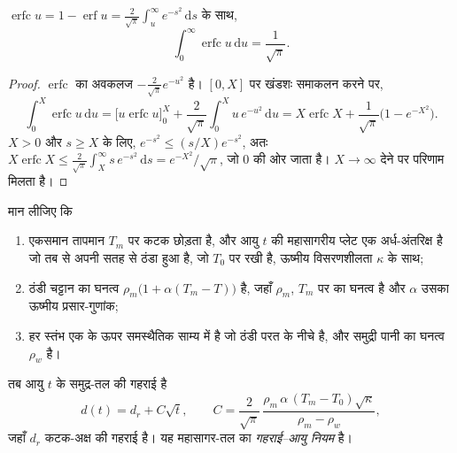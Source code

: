 \begin{lemma}[त्रुटि-फलन का एक समाकल]\label{lem:b1:rifts-ridges-margins:erfc}
$\operatorname{erfc} u = 1 - \operatorname{erf} u =
\frac{2}{\sqrt\pi}\int_u^\infty e^{-s^2}\,\mathrm ds$ के साथ,
\[
  \int_0^\infty \operatorname{erfc} u \,\mathrm du = \frac{1}{\sqrt\pi}.
\]
\end{lemma}

\begin{proof}
$\operatorname{erfc}$ का अवकलज $-\frac{2}{\sqrt\pi}e^{-u^2}$ है। $[0, X]$ पर खंडशः समाकलन करने पर,
\[
  \int_0^X \operatorname{erfc} u\,\mathrm du
  = \bigl[u \operatorname{erfc} u\bigr]_0^X + \frac{2}{\sqrt\pi}\int_0^X u\,e^{-u^2}\,\mathrm du
  = X\operatorname{erfc} X + \frac{1}{\sqrt\pi}\bigl(1 - e^{-X^2}\bigr).
\]
$X > 0$ और $s \ge X$ के लिए, $e^{-s^2} \le (s/X)e^{-s^2}$, अतः
$X\operatorname{erfc} X \le \frac{2}{\sqrt\pi}\int_X^\infty s\,e^{-s^2}\,\mathrm ds
= e^{-X^2}/\sqrt\pi$, जो 0 की ओर जाता है। $X \to \infty$ देने पर परिणाम मिलता है।
\end{proof}

\begin{theorem}[गहराई–आयु नियम]\label{thm:b1:rifts-ridges-margins:depth-age}
मान लीजिए कि
\begin{enumerate}
  \item {} एकसमान तापमान $T_m$ पर कटक छोड़ता है, और आयु $t$ की महासागरीय प्लेट एक अर्ध-अंतरिक्ष है जो तब से अपनी सतह से ठंडा हुआ है, जो $T_0$ पर रखी है, ऊष्मीय विसरणशीलता $\kappa$ के साथ;
  \item ठंडी चट्टान का घनत्व $\rho_m\bigl(1 + \alpha(T_m -
        T)\bigr)$ है, जहाँ $\rho_m$, $T_m$ पर  का घनत्व है और $\alpha$ उसका ऊष्मीय प्रसार-गुणांक;
  \item हर स्तंभ एक  के ऊपर समस्थैतिक साम्य में है जो ठंडी परत के नीचे है, और समुद्री पानी का घनत्व $\rho_w$ है।
\end{enumerate}
तब आयु $t$ के समुद्र-तल की गहराई है
\[
  d(t) = d_r + C\sqrt t, \qquad
  C = \frac{2}{\sqrt\pi}\,\frac{\rho_m\,\alpha\,(T_m - T_0)\sqrt\kappa}{\rho_m - \rho_w},
\]
जहाँ $d_r$ कटक-अक्ष की गहराई है। यह महासागर-तल का \emph{गहराई–आयु नियम} है।
\end{theorem}

